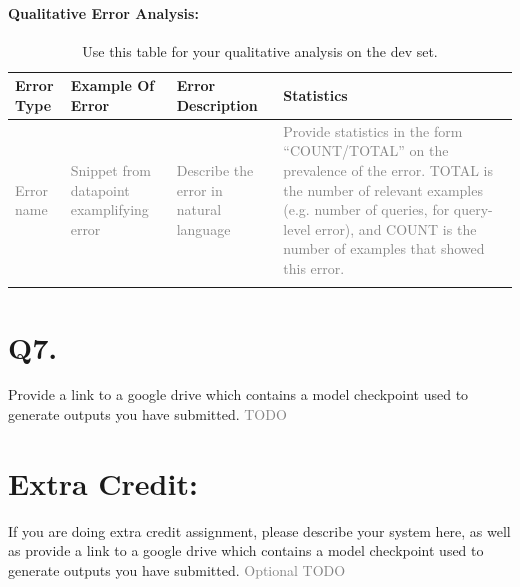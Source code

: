 \documentclass{article}
\begin{document}
\paragraph{Qualitative Error Analysis:} 


\begin{landscape}
\begin{table}
  \centering
  \begin{tabular}{p{2cm}p{6cm}p{6cm}p{6cm}}
    \toprule
    \textbf{Error Type}& \textbf{Example Of Error} & \textbf{Error Description} & \textbf{Statistics} \\
    \midrule
    \textcolor{gray}{Error name}  & \textcolor{gray}{Snippet from datapoint examplifying error} & \textcolor{gray}{Describe the error in natural language} & \textcolor{gray}{Provide statistics in the form ``COUNT/TOTAL'' on the prevalence of the error. TOTAL is the number of relevant examples (e.g. number of queries, for query-level error), and COUNT is the number of examples that showed this error.}  \\
    
    \midrule
    &  &   & \\
    \bottomrule
  \end{tabular}
  \label{tab:qualitative}
  \caption{Use this table for your qualitative analysis on the dev set.}\label{tab:qualitative}
\end{table}
\end{landscape}

\section*{Q7.}

Provide a link to a google drive which contains a model checkpoint used to generate outputs you have submitted. 
\textcolor{gray}{TODO}

\section*{Extra Credit: }

If you are doing extra credit assignment, please describe your system here, as well as provide a link to a google drive which contains a model checkpoint used to generate outputs you have submitted. 
\textcolor{gray}{Optional TODO}
\end{document}
